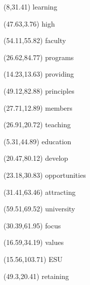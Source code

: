 \documentclass[11pt]{letter} %
\begin{document}
\begin{textblock}{0}(8,31.41) \footnotesize{learning} \end{textblock}
\begin{textblock}{0}(47.63,3.76) \tiny{high} \end{textblock}
\begin{textblock}{0}(54.11,55.82) \small{faculty} \end{textblock}
\begin{textblock}{0}(26.62,84.77) \footnotesize{programs} \end{textblock}
\begin{textblock}{0}(14.23,13.63) \small{providing} \end{textblock}
\begin{textblock}{0}(49.12,82.88) \scriptsize{principles} \end{textblock}
\begin{textblock}{0}(27.71,12.89) \footnotesize{members} \end{textblock}
\begin{textblock}{0}(26.91,20.72) \footnotesize{teaching} \end{textblock}
\begin{textblock}{0}(5.31,44.89) \footnotesize{education} \end{textblock}
\begin{textblock}{0}(20.47,80.12) \scriptsize{develop} \end{textblock}
\begin{textblock}{0}(23.18,30.83) \LARGE{opportunities} \end{textblock}
\begin{textblock}{0}(31.41,63.46) \small{attracting} \end{textblock}
\begin{textblock}{0}(59.51,69.52) \huge{university} \end{textblock}
\begin{textblock}{0}(30.39,61.95) \tiny{focus} \end{textblock}
\begin{textblock}{0}(16.59,34.19) \small{values} \end{textblock}
\begin{textblock}{0}(15.56,103.71) \tiny{ESU} \end{textblock}
\begin{textblock}{0}(49.3,20.41) \normalsize{retaining} \end{textblock}
\end{document}
